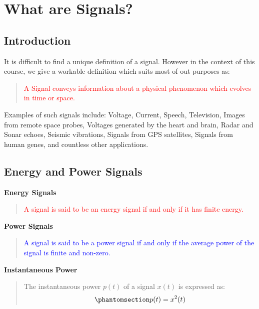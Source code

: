 \documentclass[
  14pt,
  a4paper,
  oneside,
  open=any,
  a4paper,
  14pt]{report}
\begin{document}
\section{What are Signals?}\label{what-are-signals}

\subsection{Introduction}\label{introduction-1}

It is difficult to find a unique definition of a signal. However in the
context of this course, we give a workable definition which suits most
of out purposes as:

\begin{quote}
\textcolor{red}{A Signal conveys information about a physical phenomenon
which evolves in time or space.}
\end{quote}

Examples of such signals include: Voltage, Current, Speech, Television,
Images from remote space probes, Voltages generated by the heart and
brain, Radar and Sonar echoes, Seismic vibrations, Signals from GPS
satellites, Signals from human genes, and countless other applications.

\subsection{Energy and Power Signals}\label{energy-and-power-signals}

\textbf{Energy Signals}

\begin{quote}
\textcolor{red}{A signal is said to be an energy signal if and only if
it has finite energy.}
\end{quote}

\textbf{Power Signals}

\begin{quote}
\textcolor{blue}{A signal is said to be a power signal if and only if
the average power of the signal is finite and non-zero.}
\end{quote}

\textbf{Instantaneous Power}

\begin{quote}
The instantaneous power \(p(t)\) of a signal \(x(t)\) is expressed as:
\begin{equation}\phantomsection\label{eq-instantaneous-power-def}{
p(t) = x^2(t)
}\end{equation}
\end{quote}
\end{document}
